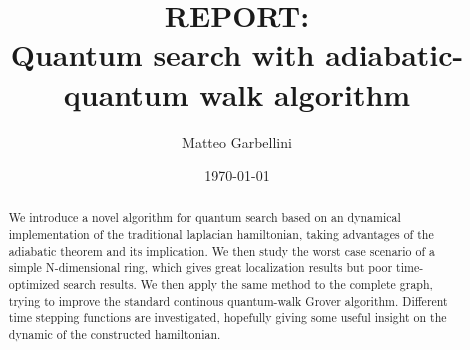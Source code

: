 \documentclass[aps,pra,reprint]{revtex4-2}
\begin{document}

\title{REPORT: \\ Quantum search with adiabatic-quantum walk algorithm}


\author{Matteo Garbellini}


\date{\today}

\begin{abstract}
We introduce a novel algorithm for quantum search based on an dynamical implementation of the traditional laplacian hamiltonian, taking advantages of the adiabatic theorem and its implication. We then study the worst case scenario of a simple N-dimensional ring, which gives great localization results but poor time-optimized search results. We then apply the same method to the complete graph, trying to improve the standard continous quantum-walk Grover algorithm. Different time stepping functions are investigated, hopefully giving some useful insight on the dynamic of the constructed hamiltonian. 
\end{abstract}

\end{document}
